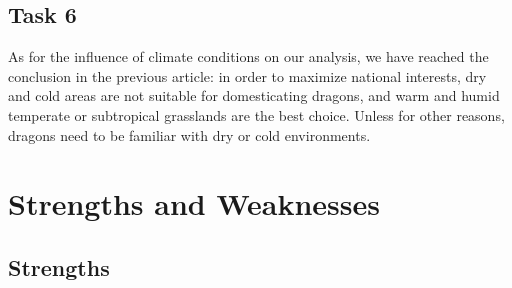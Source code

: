 \documentclass[12pt]{article}  %
\begin{document}
\subsection{Task 6}
\vspace{-0.3cm}

As for the influence of climate conditions on our analysis, we have reached the conclusion in the previous article: in order to maximize national interests, dry and cold areas are not suitable for domesticating dragons, and warm and humid temperate or subtropical grasslands are the best choice. Unless for other reasons, dragons need to be familiar with dry or cold environments.



\section{Strengths and Weaknesses}
\vspace{-0.3cm}

\subsection{Strengths}
\vspace{-0.3cm}
\end{document}
